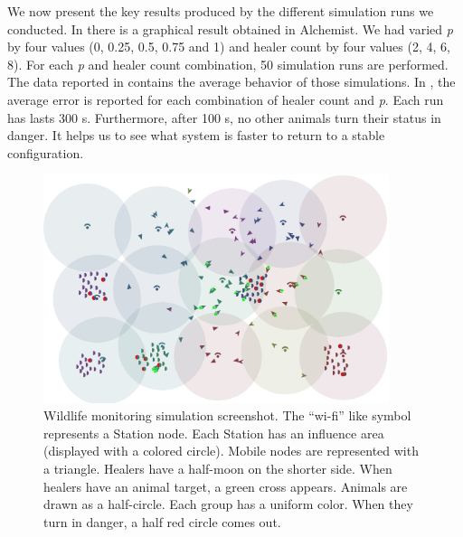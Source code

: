 \documentclass[jsan,article,accept,moreauthors,pdftex]{Definitions/mdpi}
\begin{document}
\begin{paracol}{2}
We now present the key results produced 
 by the different simulation runs we conducted. In  there is
 a graphical result obtained in Alchemist.
%
 We had varied \emph{p} by four values (0, 0.25, 0.5, 0.75 and 1) and {healer count} by four values (2, 4, 6, 8). 
 For each \emph{p} and {healer count} combination, 50 simulation runs are performed. 
 The data reported in \mbox{} contains the average behavior of those simulations. 
% 
In , the average error is reported for each combination of {healer count} and \emph{p}.
%
Each run has lasts 300 s. 
 Furthermore, after 100 s, no other animals turn their status in danger.
 It helps us to see what system is faster to return to a stable configuration.
 
\end{paracol}
\nointerlineskip
 \begin{figure}[H]
\widefigure
\includegraphics[width=0.9\textwidth]{imgs/alchemist-v2.png}

\caption{Wildlife monitoring simulation screenshot. 
 The ``wi-fi'' like symbol represents a {Station} node. 
 Each {Station} has an influence area (displayed with a colored circle). 
 Mobile nodes are represented with a triangle.
 Healers have a half-moon on the shorter side. 
 When healers have an animal target, a green cross appears. 
 Animals are drawn as a half-circle. Each group has a uniform color. 
 When they turn in danger, a half red circle comes out.
}
\label{fig:wildlife-monitoring-gui}
\end{figure}
\end{document}
